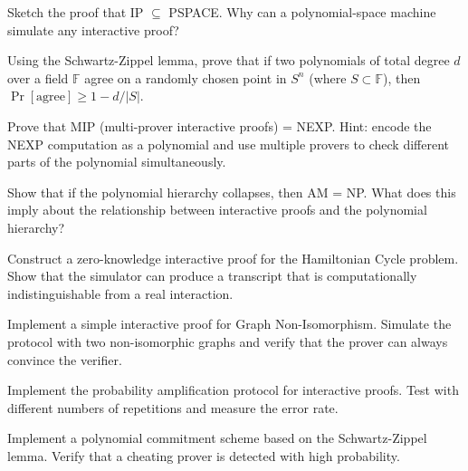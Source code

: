 \begin{exercise}[Challenge]
Sketch the proof that IP $\subseteq$ PSPACE. Why can a polynomial-space machine simulate any interactive proof?
\end{exercise}

\begin{exercise}[Challenge]
Using the Schwartz-Zippel lemma, prove that if two polynomials of total degree $d$ over a field $\mathbb{F}$ agree on a randomly chosen point in $S^n$ (where $S \subset \mathbb{F}$), then $\Pr[\text{agree}] \ge 1 - d/|S|$.
\end{exercise}

\begin{exercise}[Challenge]
Prove that MIP (multi-prover interactive proofs) = NEXP. Hint: encode the NEXP computation as a polynomial and use multiple provers to check different parts of the polynomial simultaneously.
\end{exercise}

\begin{exercise}[Challenge]
Show that if the polynomial hierarchy collapses, then AM = NP. What does this imply about the relationship between interactive proofs and the polynomial hierarchy?
\end{exercise}

\begin{exercise}[Challenge]
Construct a zero-knowledge interactive proof for the Hamiltonian Cycle problem. Show that the simulator can produce a transcript that is computationally indistinguishable from a real interaction.
\end{exercise}

\begin{exercise}[Computational]
Implement a simple interactive proof for Graph Non-Isomorphism. Simulate the protocol with two non-isomorphic graphs and verify that the prover can always convince the verifier.
\end{exercise}

\begin{exercise}[Computational]
Implement the probability amplification protocol for interactive proofs. Test with different numbers of repetitions and measure the error rate.
\end{exercise}

\begin{exercise}[Computational]
Implement a polynomial commitment scheme based on the Schwartz-Zippel lemma. Verify that a cheating prover is detected with high probability.
\end{exercise}

